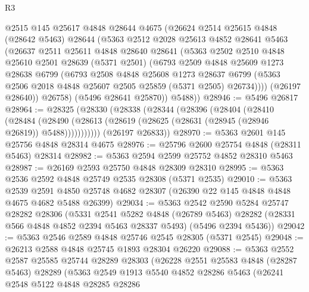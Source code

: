 \begin{lexlean}{R3}
\begin{coremodule}
        @2515
        @145
        @25617
        @4848
        @28644
        @4675
        (@26624
          @2514
          @25615
          @4848
          (@28642 @5463)
          @28644
          (@5363
            @2512
            @2028
            @25613
            @4852
            @28641
            @5463
            (@26637
              @2511
              @25611
              @4848
              @28640
              @28641
              (@5363
                @2502
                @2510
                @4848
                @25610
                @2501
                @28639
                (@5371 @2501)
                (@6793
                  @2509
                  @4848
                  @25609
                  @1273
                  @28638
                  @6799
                  (@6793
                    @2508
                    @4848
                    @25608
                    @1273
                    @28637
                    @6799
                    (@5363 @2506 @2018 @4848 @25607 @2505 @25859 (@5371 @2505) @26734))))
              (@26197 @28640))
            @26758)
          (@5496 @28641 @25870))
        @5488))
@28946 := @5496 @26817
@28964 := @28325
    (@28330
      (@28338
        (@28344
          (@28396
            (@28404
              (@28410
                (@28484
                  (@28490 (@28613 (@28619 (@28625 (@28631 (@28945 (@28946 @26819)) @5488)))))))))))
      (@26197 @26833))
@28970 := @5363 @2601 @145 @25756 @4848 @28314 @4675
@28976 := @25796 @2600 @25754 @4848 (@28311 @5463) @28314
@28982 := @5363 @2594 @2599 @25752 @4852 @28310 @5463
@28987 := @26169 @2593 @25750 @4848 @28309 @28310
@28995 := @5363 @2536 @2592 @4848 @25749 @2535 @28308 (@5371 @2535)
@29010 := @5363
    @2539
    @2591
    @4850
    @25748
    @4682
    @28307
    (@26390 @22 @145 @4848 @4848 @4675 @4682 @5488 @26399)
@29034 := @5363
    @2542
    @2590
    @5284
    @25747
    @28282
    @28306
    (@5331
      @2541
      @5282
      @4848
      (@26789 @5463)
      @28282
      (@28331 @566 @4848 @4852 @2394 @5463 @28337 @5493)
      (@5496 @2394 @5436))
@29042 := @5363 @2546 @2589 @4848 @25746 @2545 @28305 (@5371 @2545)
@29048 := @26213 @2588 @4848 @25745 @1893 @28304 @26220
@29088 := @5363
    @2552
    @2587
    @25585
    @25744
    @28289
    @28303
    (@26228
      @2551
      @25583
      @4848
      (@28287 @5463)
      @28289
      (@5363
        @2549
        @1913
        @5540
        @4852
        @28286
        @5463
        (@26241
          @2548
          @5122
          @4848
          @28285
          @28286

\end{coremodule}
\end{lexlean}
